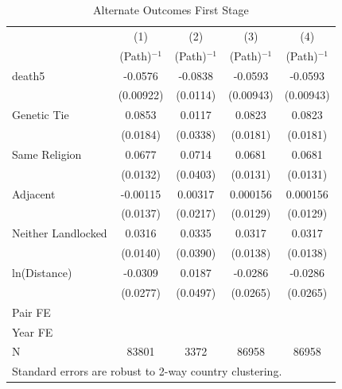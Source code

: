 \documentclass{article}
\begin{document}
\begin{table}[htbp]\centering
\caption{Alternate Outcomes First Stage \label{tab:AltOutcomesFirst}}
\begin{tabular}{l*{4}{c}}
\toprule
                    &\multicolumn{1}{c}{(1)}&\multicolumn{1}{c}{(2)}&\multicolumn{1}{c}{(3)}&\multicolumn{1}{c}{(4)}\\
                    &\multicolumn{1}{c}{(Path)$^{-1}$}&\multicolumn{1}{c}{(Path)$^{-1}$}&\multicolumn{1}{c}{(Path)$^{-1}$}&\multicolumn{1}{c}{(Path)$^{-1}$}\\
\midrule
death5              &     -0.0576&     -0.0838&     -0.0593&     -0.0593\\
                    &   (0.00922)&    (0.0114)&   (0.00943)&   (0.00943)\\
\addlinespace
Genetic Tie         &      0.0853&      0.0117&      0.0823&      0.0823\\
                    &    (0.0184)&    (0.0338)&    (0.0181)&    (0.0181)\\
\addlinespace
Same Religion       &      0.0677&      0.0714&      0.0681&      0.0681\\
                    &    (0.0132)&    (0.0403)&    (0.0131)&    (0.0131)\\
\addlinespace
Adjacent            &    -0.00115&     0.00317&    0.000156&    0.000156\\
                    &    (0.0137)&    (0.0217)&    (0.0129)&    (0.0129)\\
\addlinespace
Neither Landlocked  &      0.0316&      0.0335&      0.0317&      0.0317\\
                    &    (0.0140)&    (0.0390)&    (0.0138)&    (0.0138)\\
\addlinespace
ln(Distance)        &     -0.0309&      0.0187&     -0.0286&     -0.0286\\
                    &    (0.0277)&    (0.0497)&    (0.0265)&    (0.0265)\\
\midrule
Pair FE             &            &            &            &            \\
Year FE             &            &            &            &            \\
N                   &       83801&        3372&       86958&       86958\\
\bottomrule
\multicolumn{5}{l}{\footnotesize Standard errors are robust to 2-way country clustering.}\\
\end{tabular}
\end{table}
\end{document}
